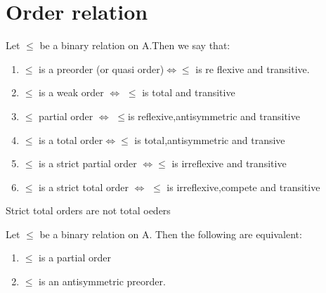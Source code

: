 \documentclass[cn,10pt,math=newtx,citestyle=gb7714-2015,bibstyle=gb7714-2015]{elegantbook}
\begin{document}
\section{Order relation}

\begin{proposition}
    Let $\leq$ be a binary relation on A.Then we say that:
    \begin{enumerate}
        \item $\leq$ is a preorder (or quasi order)$\Leftrightarrow$$\leq$ is re flexive and transitive.
        \item $\leq$ is a weak order $\Leftrightarrow$ $\leq$ is total and transitive 
        \item $\leq$ partial order $\Leftrightarrow$ $\leq$is reflexive,antisymmetric and transitive
        \item $\leq$ is a total order$\Leftrightarrow$$\leq$ is total,antisymmetric and transive
        \item $\leq$ is a strict partial order $\Leftrightarrow$$\leq$ is irreflexive and transitive
        \item $\leq$ is a strict total order $\Leftrightarrow$ $\leq$ is irreflexive,compete and transitive 
    \end{enumerate}
    \begin{remark}
        \textcolor{red!80}{Strict total orders are not total oeders}
    \end{remark}
\end{proposition}

\begin{theorem}
    Let $\leq$ be a binary relation on A. Then the 
following are equivalent:
\begin{enumerate}
    \item $\leq$ is a partial order
    \item $\leq$ is an antisymmetric preorder.
\end{enumerate}
\end{theorem}
\end{document}
